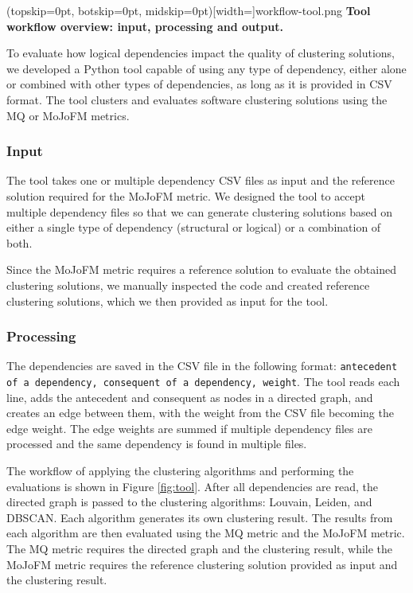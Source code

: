 \documentclass{ieeeaccess}
\begin{document}
\Figure[t!](topskip=0pt, botskip=0pt, midskip=0pt)[width=\textwidth]{workflow-tool.png}
{ \textbf{Tool workflow overview: input, processing and output.}\label{fig:tool}}

To evaluate how logical dependencies impact the quality of clustering solutions, we developed a Python tool capable of using any type of dependency, either alone or combined with other types of dependencies, as long as it is provided in CSV format. The tool clusters and evaluates software clustering solutions using the MQ or MoJoFM metrics.



\subsubsection{Input}

The tool takes one or multiple dependency CSV files as input and the reference solution required for the MoJoFM metric. We designed the tool to accept multiple dependency files so that we can generate clustering solutions based on either a single type of dependency (structural or logical) or a combination of both.

Since the MoJoFM metric requires a reference solution to evaluate the obtained clustering solutions, we manually inspected the code and created reference clustering solutions, which we then provided as input for the tool.

\subsubsection{Processing}

The dependencies are saved in the CSV file in the following format: \texttt{antecedent of a dependency, consequent of a dependency, weight}. The tool reads each line, adds the antecedent and consequent as nodes in a directed graph, and creates an edge between them, with the weight from the CSV file becoming the edge weight. The edge weights are summed if multiple dependency files are processed and the same dependency is found in multiple files.

The workflow of applying the clustering algorithms and performing the evaluations is shown in Figure \ref{fig:tool}. After all dependencies are read, the directed graph is passed to the clustering algorithms: Louvain, Leiden, and DBSCAN. Each algorithm generates its own clustering result. The results from each algorithm are then evaluated using the MQ metric and the MoJoFM metric. The MQ metric requires the directed graph and the clustering result, while the MoJoFM metric requires the reference clustering solution provided as input and the clustering result.
\end{document}
